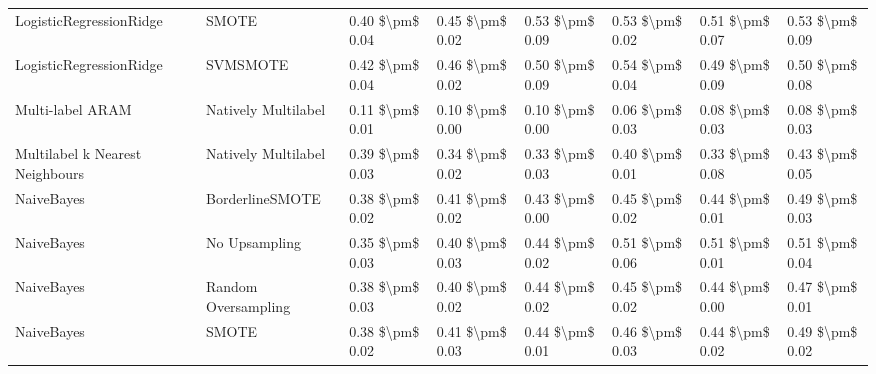 \begin{tabular}{llllllll}
        LogisticRegressionRidge &                         SMOTE & 0.40 \$\textbackslash pm\$ 0.04 &           0.45 \$\textbackslash pm\$ 0.02 &       0.53 \$\textbackslash pm\$ 0.09 &        0.53 \$\textbackslash pm\$ 0.02 &                         0.51 \$\textbackslash pm\$ 0.07 &     0.53 \$\textbackslash pm\$ 0.09 \\
        LogisticRegressionRidge &                      SVMSMOTE & 0.42 \$\textbackslash pm\$ 0.04 &           0.46 \$\textbackslash pm\$ 0.02 &       0.50 \$\textbackslash pm\$ 0.09 &        0.54 \$\textbackslash pm\$ 0.04 &                         0.49 \$\textbackslash pm\$ 0.09 &     0.50 \$\textbackslash pm\$ 0.08 \\
               Multi-label ARAM &           Natively Multilabel & 0.11 \$\textbackslash pm\$ 0.01 &           0.10 \$\textbackslash pm\$ 0.00 &       0.10 \$\textbackslash pm\$ 0.00 &        0.06 \$\textbackslash pm\$ 0.03 &                         0.08 \$\textbackslash pm\$ 0.03 &     0.08 \$\textbackslash pm\$ 0.03 \\
Multilabel k Nearest Neighbours &           Natively Multilabel & 0.39 \$\textbackslash pm\$ 0.03 &           0.34 \$\textbackslash pm\$ 0.02 &       0.33 \$\textbackslash pm\$ 0.03 &        0.40 \$\textbackslash pm\$ 0.01 &                         0.33 \$\textbackslash pm\$ 0.08 &     0.43 \$\textbackslash pm\$ 0.05 \\
                     NaiveBayes &               BorderlineSMOTE & 0.38 \$\textbackslash pm\$ 0.02 &           0.41 \$\textbackslash pm\$ 0.02 &       0.43 \$\textbackslash pm\$ 0.00 &        0.45 \$\textbackslash pm\$ 0.02 &                         0.44 \$\textbackslash pm\$ 0.01 &     0.49 \$\textbackslash pm\$ 0.03 \\
                     NaiveBayes &                 No Upsampling & 0.35 \$\textbackslash pm\$ 0.03 &           0.40 \$\textbackslash pm\$ 0.03 &       0.44 \$\textbackslash pm\$ 0.02 &        0.51 \$\textbackslash pm\$ 0.06 &                         0.51 \$\textbackslash pm\$ 0.01 &     0.51 \$\textbackslash pm\$ 0.04 \\
                     NaiveBayes &           Random Oversampling & 0.38 \$\textbackslash pm\$ 0.03 &           0.40 \$\textbackslash pm\$ 0.02 &       0.44 \$\textbackslash pm\$ 0.02 &        0.45 \$\textbackslash pm\$ 0.02 &                         0.44 \$\textbackslash pm\$ 0.00 &     0.47 \$\textbackslash pm\$ 0.01 \\
                     NaiveBayes &                         SMOTE & 0.38 \$\textbackslash pm\$ 0.02 &           0.41 \$\textbackslash pm\$ 0.03 &       0.44 \$\textbackslash pm\$ 0.01 &        0.46 \$\textbackslash pm\$ 0.03 &                         0.44 \$\textbackslash pm\$ 0.02 &     0.49 \$\textbackslash pm\$ 0.02 \\

\end{tabular}
